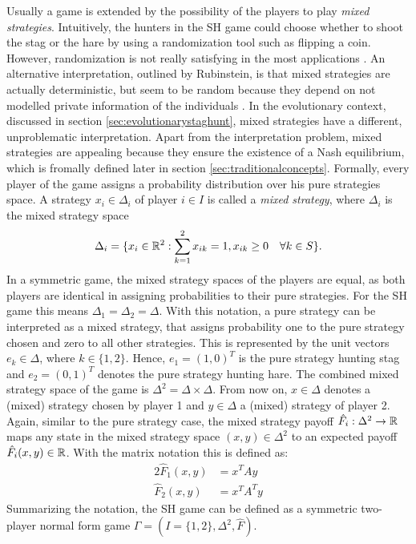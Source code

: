 Usually a game is extended by the possibility of the players to play
\textit{mixed strategies}. 
Intuitively, the hunters in the SH game could  
choose whether to shoot the stag or the hare by using a randomization
tool such as flipping a coin. However, randomization is not really
satisfying in the most applications \parencite{radner_private_1982}. An
alternative interpretation, outlined by Rubinstein, is that mixed 
strategies are actually deterministic, but seem to be random because they 
depend on not modelled private information of the individuals 
\parencite[914]{rubinstein_comments_1991}. In the evolutionary context,
discussed in section \ref{sec:evolutionarystaghunt}, mixed strategies have
a different, unproblematic interpretation. Apart from the interpretation 
problem, mixed strategies are appealing because they ensure the existence
of a Nash equilibrium, which is fromally defined later in section 
\ref{sec:traditionalconcepts}.
Formally, every player of the game assigns a probability distribution over
his pure strategies space. A strategy $x_i \in \Delta_i$ of 
player $i \in I$ is called a \textit{mixed strategy}, where $\Delta_i$ is 
the mixed strategy space 
\begin{align*}
        \Delta_i = \{ x_i \in \mathbb{R}^2 : \sum_{k=1}^2 x_{ik} = 1, x_{ik} \geq 0 \quad
\forall k \in S\}.
\end{align*}
In a symmetric game, the mixed strategy spaces of the players are
equal, as both players are identical in assigning probabilities to their
pure strategies. For the SH game this means $\Delta_1 = \Delta_2 = \Delta$.
With this notation, a pure strategy can be interpreted as a mixed strategy,
that assigns probability one to the pure strategy chosen and zero to all
other strategies. This is represented by the unit vectors 
$e_k \in \Delta$, where $k \in \{1,2\}$. 
Hence, $e_1 = (1,0)^T$ is the pure strategy hunting stag 
and $e_2 =(0,1)^T$ denotes the pure strategy hunting hare.
The combined mixed strategy space of the game is $\Delta^2 = \Delta \times
\Delta$.
From now on, $x \in \Delta$ denotes a (mixed) strategy
chosen by player 1 and $y \in \Delta$ a (mixed) strategy of player 2.
Again, similar to the pure strategy case, the mixed strategy payoff 
$\hat{F}_i:\Delta^2 \rightarrow \mathbb{R}$ maps 
any state in the mixed strategy
space  $(x,y) \in \Delta^2$ to an expected payoff 
$\hat{F}_i(x,y) \in \mathbb{R}$.
With the matrix notation this is defined as: 
\begin{alignat*}{2}
        \hat{F}_1(x,y) &= x^T A y \\
        \hat{F}_2(x,y) &= x^T A^T y 
\end{alignat*}
Summarizing the notation, the SH game can be defined as a symmetric two-player
normal form game $\Gamma = (I=\{1,2\}, \Delta^2, \hat{F})$.

